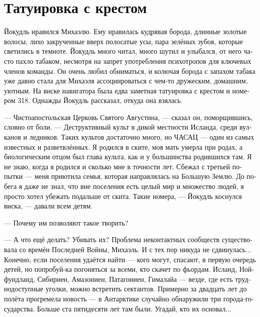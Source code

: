 \documentclass[a4paper,12pt,fleqn]{book}\usepackage{polyglossia}\setdefaultlanguage[babelshorthands=true]{russian}\setotherlanguage{english}\defaultfontfeatures{Ligatures=TeX,Mapping=tex-text}\usepackage{xcolor}\newcommand{\ml}[3]{#2}
\begin{document}
\section{Татуировка с крестом}

Йокудль нравился Михаэлю.
Ему нравилась кудрявая борода, длинные золотые волосы, лихо закрученные вверх полосатые усы, пара зелёных зубов, которые светились в темноте.
Йокудль много читал, много шутил и улыбался, от него часто пахло табаком, несмотря на запрет употребления психотропов для ключевых членов команды.
Он очень любил обниматься, и колючая борода с запахом табака уже давно стала для Михаэля ассоциироваться с чем-то дружеским, домашним, уютным.
На виске навигатора была едва заметная татуировка с крестом и номером 318.
Однажды Йокудль рассказал, откуда она взялась.

\ml{$0$}
{--- Чистоапостольская Церковь Святого Августина, --- сказал он, поморщившись, словно от боли.}
{``Pure Apostolic Saint Augustine Church,'' he said, like he was feeling pain.}
\ml{$0$}
{--- Деструктивный культ в дикой местности Исланда, среди вулканов и ледников.}
{``A destructive cult from Island wilderness, among volcanos and glaciers.}
\ml{$0$}
{Таких культов достаточно много, но ЧАСАЦ --- один из самых известных и разветвлённых.}
{There are many cults like those, but PASAC is one of the most famous and most branched.}
\ml{$0$}
{Я родился в ските, моя мать умерла при родах, а биологическим отцом был глава культа, как и у большинства родившихся там.}
{I was born in a skete, my mother died in childbirth, and a cult patriarch was my father and a father of most children there.}
\ml{$0$}
{Я не знаю, когда я родился и сколько мне в точности лет.}
{I don't know my date of birth, even how old exactly I am.}
\ml{$0$}
{Сбежал с третьей попытки --- меня приютила семья, которая направлялась на Большую Землю.}
{It took me three attempts to escape, the family which took me in was en route to the Mainland.}
\ml{$0$}
{До побега я даже не знал, что вне поселения есть целый мир и множество людей, я просто хотел убежать подальше от скита.}
{Before I succeed, I haven't had any idea how big the world is or how many people there live, I just wanted to run far-far away from the skete.}
Такие номера, --- Йокудль коснулся виска, --- давали всем детям.

--- Почему им позволяют такое творить?

--- А что ещё делать?
Убивать их?
Проблема неконтактных сообществ существовала со времён Последней Войны, Михаэль.
И с тех пор никуда не сдвинулась...
Конечно, если поселения удаётся найти --- кого могут, спасают, в первую очередь детей, но попробуй-ка погоняться за всеми, кто скачет по фьордам.
Исланд, Нойфундланд, Сибириен, Амазониен, Патагониен, Гималайа --- везде, где есть труднодоступные уголки, можно встретить сектантов.
Примерно за двадцать лет до полёта прогремела новость --- в Антарктике случайно обнаружили три города-государства.
Больше ста пятидесяти лет там были.
Угадай, кто их основал...
\end{document}
